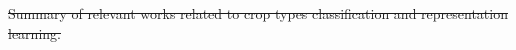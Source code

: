 \documentclass[journal,article,submit,pdftex,moreauthors]{Definitions/mdpi}
\providecommand{\DIFdel}[1]{{\protect\color{red}\sout{#1}}}                      %
\providecommand{\DIFdelbegin}{} %
\providecommand{\DIFdelFL}[1]{\DIFdel{#1}} %
\begin{document}

\DIFdelbegin %
{%
\DIFdelFL{Summary of relevant works related to crop types classification and representation learning.}}
\end{document}
